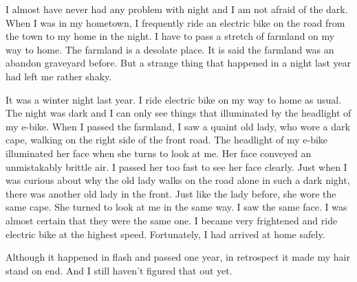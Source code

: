 \documentclass[12pt,a4paper]{caspset}
\begin{document}

I almost have never had any problem with night and I am not afraid of the dark. When I was in my hometown, I frequently ride an electric bike on the road from the town to my home in the night. I have to pass a stretch of farmland on my way to home. The farmland is a desolate place. It is said the farmland was an abandon graveyard before. But a strange thing that happened in a night last year had left me rather shaky.

It was a winter night last year. I ride electric bike on my way to home as usual. The night was dark and I can only see things that illuminated by the headlight of my e-bike. When I passed the farmland, I saw a quaint old lady, who wore a dark cape, walking on the right side of the front road. The headlight of my e-bike illuminated her face when she turns to look at me. Her face conveyed an unmistakably brittle air. I passed her too fast to see her face clearly. Just when I was curious about why the old lady walks on the road alone in such a dark night, there was another old lady in the front. Just like the lady before, she wore the same cape. She turned to look at me in the same way. I saw the same face. I was almost certain that they were the same one. I became very frightened and ride electric bike at the highest speed. Fortunately, I had arrived at home safely.

Although it happened in flash and passed one year, in retrospect it made my hair stand on end.  And I still haven't figured that out yet.
\end{document}

